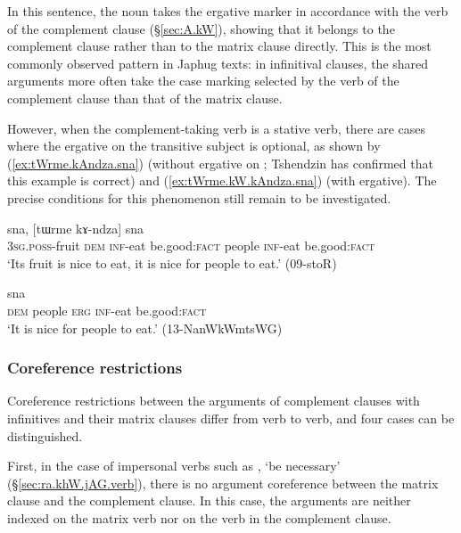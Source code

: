 In this sentence, the noun takes the ergative marker  in accordance with the verb of the complement clause (§\ref{sec:A.kW}), showing that it belongs to the complement clause rather than to the matrix clause directly. This is the most commonly observed pattern in Japhug texts: in infinitival clauses, the shared arguments more often take the case marking selected by the verb of the complement clause than that of the matrix clause.

However, when the com\-ple\-ment-taking verb is a stative verb, there are cases where the ergative on the transitive subject is optional, as shown by (\ref{ex:tWrme.kAndza.sna}) (without ergative on ; Tshendzin has confirmed that this example is correct) and (\ref{ex:tWrme.kW.kAndza.sna}) (with ergative). The precise conditions for this phenomenon still remain to be investigated.

\begin{exe}
\ex \label{ex:tWrme.kAndza.sna}
 sna, [tɯrme kɤ-ndza] sna \\
\textsc{3sg}.\textsc{poss}-fruit \textsc{dem} \textsc{inf}-eat be.good:\textsc{fact} people \textsc{inf}-eat be.good:\textsc{fact} \\
\glt `Its fruit is nice to eat, it is nice for people to eat.' (09-stoR)
\end{exe}

\begin{exe}
\ex \label{ex:tWrme.kW.kAndza.sna}
 sna \\
\textsc{dem} people \textsc{erg} \textsc{inf}-eat be.good:\textsc{fact} \\
\glt `It is nice for people to eat.' (13-NanWkWmtsWG)
\end{exe}

\subsubsection{Coreference restrictions} \label{sec:velar.inf.coreference}
Coreference restrictions between the arguments of complement clauses with  infinitives and their matrix clauses differ from verb to verb, and four cases can be distinguished.

First, in the case of impersonal verbs such as , `be necessary' (§\ref{sec:ra.khW.jAG.verb}), there is no argument coreference between the matrix clause and the complement clause. In this case, the arguments are neither indexed on the matrix verb nor on the verb in the complement clause.

